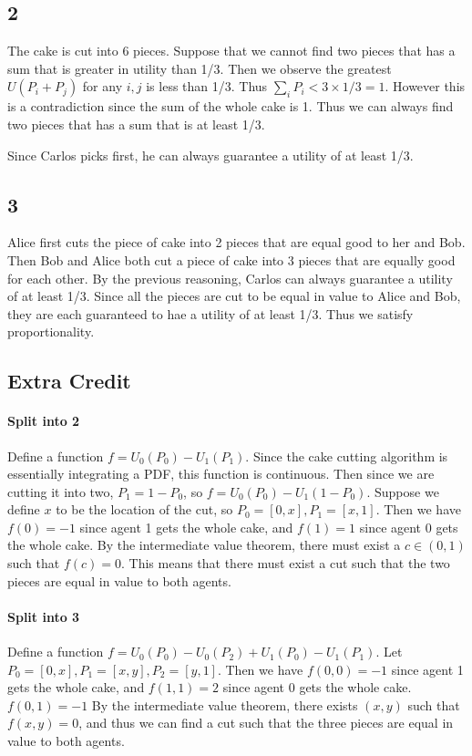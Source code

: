 \documentclass[12pt]{article}
\begin{document}
\subsection*{2}
The cake is cut into 6 pieces. Suppose that we cannot find two pieces that has a sum that is greater in utility than 1/3. 
Then we observe the greatest $U(P_i + P_j)$ for any $i, j$ is less than 1/3. Thus $\sum_i P_i < 3 \times 1/3 = 1$. 
However this is a contradiction since the sum of the whole cake is 1. Thus we can always find two pieces that has a sum that is 
at least 1/3.

Since Carlos picks first, he can always guarantee a utility of at least 1/3.

\subsection*{3}
Alice first cuts the piece of cake into 2 pieces that are equal good to her and 
Bob. Then Bob and Alice both cut a piece of cake into 3 pieces that are equally good for each other. 
By the previous reasoning, Carlos can always guarantee a utility of at least 1/3. Since all the pieces are 
cut to be equal in value to Alice and Bob, they are each guaranteed to hae a utility of at least 1/3.
Thus we satisfy proportionality.

\subsection*{Extra Credit}
\paragraph*{Split into 2}
Define a function $f = U_0(P_0) - U_1(P_1)$. Since the cake cutting algorithm is essentially integrating a PDF, this 
function is continuous. Then since we are cutting it into two, $P_1 = 1-P_0$, so $f= U_0(P_0) - U_1(1-P_0)$. Suppose we 
define $x$ to be the location of the cut, so $P_0 = [0, x], P_1=[x,1]$. Then we have $f(0)=-1$ since agent 1 gets the whole cake, 
and $f(1)=1$ since agent 0 gets the whole cake. By the intermediate value theorem, there must exist a $c \in (0, 1)$ such that $f(c)=0$.
This means that there must exist a cut such that the two pieces are equal in value to both agents.

\paragraph*{Split into 3}
Define a function $f = U_0(P_0) - U_0(P_2) + U_1(P_0)-U_1(P_1)$. Let $P_0 = [0, x], P_1=[x, y], P_2=[y, 1]$. Then we have 
$f(0, 0) = -1$ since agent 1 gets the whole cake, and $f(1, 1) = 2$ since agent 0 gets the whole cake. 
$f(0, 1) = -1$
By the intermediate value theorem, there exists $(x, y)$ such that $f(x,y)=0$, and thus we can find a cut such that the three pieces 
are equal in value to both agents.
\end{document}
